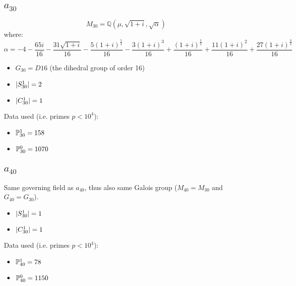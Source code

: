 \subsection{{\huge $a_{30}$}}
$$M_{30} = \mathbb{Q}\left(\mu, \sqrt{1+i}, \sqrt{\alpha}\right)$$
where:
$$\alpha = -4 - \frac{65 i}{16} - \frac{31 \sqrt{1 + i}}{16} - \frac{5 \left(1 + i\right)^{\frac{5}{2}}}{16} - \frac{3 \left(1 + i\right)^{3}}{16} + \frac{\left(1 + i\right)^{\frac{7}{2}}}{16} + \frac{11 \left(1 + i\right)^{2}}{16} + \frac{27 \left(1 + i\right)^{\frac{3}{2}}}{16}$$
\begin{itemize}
	\item $G_{30} = D16$ (the dihedral group of order 16)
	\item $| S_{30}^1 | = 2$
	\item $| C_{30}^1 | = 1$
\end{itemize}
Data used (i.e. primes $p<10^4$):
\begin{itemize}
	\item $\mathbb{P}_{30}^1 = 158$
	\item $\mathbb{P}_{30}^0 = 1070$
\end{itemize}
\subsection{{\huge $a_{40}$}}
Same governing field as $a_{40}$, thus also same Galois group ($M_{40} = M_{30}$ and $G_{40} = G_{30}$).
\begin{itemize}
	\item $| S_{30}^1 | = 1$
	\item $| C_{30}^1 | = 1$
\end{itemize}
Data used (i.e. primes $p<10^4$):
\begin{itemize}
	\item $\mathbb{P}_{40}^1 = 78$
	\item $\mathbb{P}_{40}^0 = 1150$
\end{itemize}
